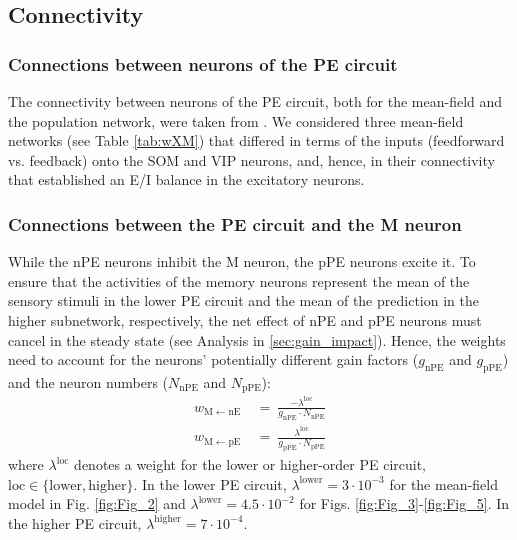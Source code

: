 \documentclass[10pt,a4paper]{article}
\begin{document}
\subsection{Connectivity}
%
%
\subsubsection{Connections between neurons of the PE circuit}
%
The connectivity between neurons of the PE circuit, both for the mean-field and the population network, were taken from \citep{hertag2022prediction}. We considered three mean-field networks (see Table \ref{tab:wXM}) that differed in terms of the inputs (feedforward vs. feedback) onto the SOM and VIP neurons, and, hence, in their connectivity that established an E/I balance in the excitatory neurons.

\subsubsection{Connections between the PE circuit and the M neuron}
%
While the nPE neurons inhibit the M neuron, the pPE neurons excite it. To ensure that the activities of the memory neurons represent the mean of the sensory stimuli in the lower PE circuit and the mean of the prediction in the higher subnetwork, respectively, the net effect of nPE and pPE neurons must cancel in the steady state (see Analysis in \ref{sec:gain_impact}). Hence, the weights need to account for the neurons' potentially different gain factors ($g_\mathrm{nPE}$ and $g_\mathrm{pPE}$) and the neuron numbers ($N_\mathrm{nPE}$ and $N_\mathrm{pPE}$):
%
\begin{align*}
w_\mathrm{M\leftarrow nE}\  &=\ \frac{-\lambda^\mathrm{loc}}{g_\mathrm{nPE} \cdot N_\mathrm{nPE}} \nonumber\\
w_\mathrm{M\leftarrow pE}\  &=\ \frac{\lambda^\mathrm{loc}}{g_\mathrm{pPE} \cdot N_\mathrm{pPE}}
\end{align*}
%
where $\lambda^\mathrm{loc}$ denotes a weight for the lower or higher-order PE circuit, $\mathrm{loc}\in\lbrace\mathrm{lower}, \mathrm{higher}\rbrace$. In the lower PE circuit,  $\lambda^\mathrm{lower}=3\cdot 10^{-3}$ for the mean-field model in Fig. \ref{fig:Fig_2} and $\lambda^\mathrm{lower}=4.5\cdot 10^{-2}$ for Figs. \ref{fig:Fig_3}-\ref{fig:Fig_5}. In the higher PE circuit, $\lambda^\mathrm{higher} = 7\cdot 10^{-4}$.
\end{document}
